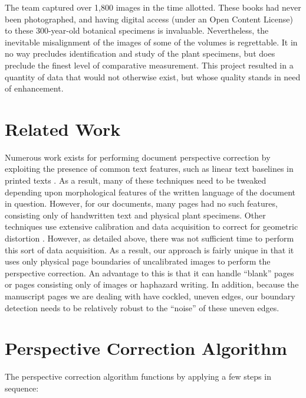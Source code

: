 \documentclass[a4paper]{llncs}
\begin{document}
The team captured over 1,800 images in the time allotted. These books had never been photographed, and having digital access (under an Open Content License) to these 300-year-old botanical specimens is invaluable. Nevertheless, the inevitable misalignment of the images of some of the volumes is regrettable. It in no way precludes identification and study of the plant specimens, but does preclude the finest level of comparative measurement. This project resulted in a quantity of data that would not otherwise exist, but whose quality stands in need of enhancement.

\section{Related Work}

Numerous work exists for performing document perspective correction by exploiting the presence of
common text features, such as linear text baselines in printed texts
\cite{Clark:2001vj,Clark:2002wk,Clark:2003wf,Cao:2003bh,Lu:2003jy,Zhang:2005dy,Monnier:2005jj,Liang:2005hc,Ulges:2005ju,Ezaki:2005jc,Pollard:2005bp,Lu:2005ih,Avila:2005jx,Zhang:2008kj,JianLiang:2008ew,Bukhari:2009tc,Beusekom:2010dg,Luo:2011go,Rahnemoonfar:2011ux,Golpardaz:2011dz,Yang:2011dt}.
As a result, many of these techniques need to be tweaked depending upon morphological features of
the written language of the document in question.
However, for our documents,
many pages had no such features, consisting only of handwritten text and physical plant
specimens.
Other techniques use extensive calibration and data acquisition to correct for geometric distortion 
\cite{Pilu:vr,Brown:2001td,Brown:2004vl,Brown:2005uy,Brown:2007ti,LiZhang:2008bp}.
However, as detailed above, there was not sufficient time to perform this sort of data acquisition.
As a result, our approach is fairly unique in that it uses only physical page boundaries of uncalibrated images to
perform the perspective correction. An advantage to this is that it can handle “blank” pages or pages
consisting only of images or haphazard writing. In addition, because the manuscript pages we are dealing with have
cockled, uneven edges, our boundary detection needs to be relatively robust to the “noise” of these uneven edges.

\section{Perspective Correction Algorithm}

The perspective correction algorithm functions by applying a few steps in sequence:
\end{document}
